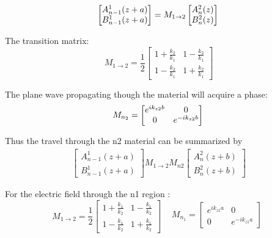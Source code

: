 \begin{equation}
	\begin{bmatrix}A^1_{n-1}(z+a)\\B^1_{n-1}(z+a) \end{bmatrix}
	= M_{1\rightarrow2}\begin{bmatrix}A^2_n(z)\\B^2_n(z) \end{bmatrix}\\
\end{equation}

The transition matrix:
\begin{equation}
	M_{1\rightarrow2} = 
	\frac{1}{2}\begin{bmatrix}1+\frac{k_2}{k_1} & 1-\frac{k_2}{k_1}\\1-\frac{k_2}{k_1} & 1+\frac{k_2}{k_1}\end{bmatrix}
\end{equation}

The plane wave propagating though the material will acquire a phase:  
\begin{equation}
	M_{n_2} = \begin{bmatrix}e^{ik_{z2}b} & 0\\0 & e^{-ik_{z2}b}\end{bmatrix}\\
\end{equation}

Thus the travel through the n2 material can be summarized by
\begin{equation}
	\begin{aligned}
		\begin{bmatrix}A^1_{n-1}(z+a)\\B^1_{n-1}(z+a) \end{bmatrix}
		M_{1\rightarrow2}M_{n2}
		\begin{bmatrix}A^2_n(z+b)\\B^2_n(z+b) \end{bmatrix}
	\end{aligned}
\end{equation}

For the electric field through the n1 region :
\begin{equation}
	M_{1\rightarrow2} = 
	\frac{1}{2}\begin{bmatrix}
		1+\frac{k_1}{k_2} & 1-\frac{k_1}{k_2}\\
		1-\frac{k_1}{k_2} & 1+\frac{k_1}{k_2}
	\end{bmatrix}
	\begin{aligned}
		&M_{n_1} =
		\begin{bmatrix}
			e^{ik_{z1}a} & 0\\
			0 & e^{-ik_{z1}a}
		\end{bmatrix}\\
	\end{aligned}
\end{equation}

